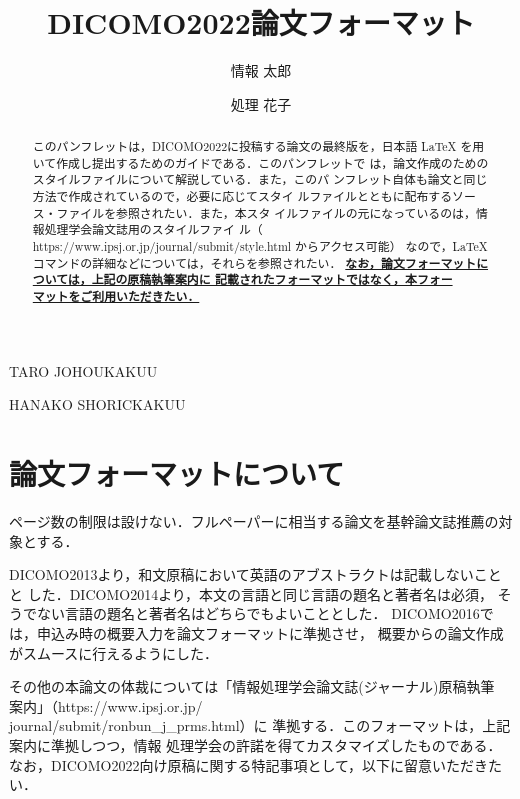 \documentclass[Japanese]{dicomopapers}
\begin{document}
\title{DICOMO2022論文フォーマット}


\author{情報 太郎}{TARO JOHO}{UKAKUU}
\author{処理 花子}{HANAKO SHORI}{CKAKUU}

\begin{abstract}
このパンフレットは，DICOMO2022に投稿する論文の最終版を，日本語
{\LaTeX} を用いて作成し提出するためのガイドである．このパンフレットで
は，論文作成のためのスタイルファイルについて解説している．また，このパ
ンフレット自体も論文と同じ方法で作成されているので，必要に応じてスタイ
ルファイルとともに配布するソース・ファイルを参照されたい．また，本スタ
イルファイルの元になっているのは，情報処理学会論文誌用のスタイルファイ
ル（ https://www.ipsj.or.jp/journal/submit/style.html からアクセス可能）
なので，{\LaTeX}コマンドの詳細などについては，それらを参照されたい．
\underline{\bf なお，論文フォーマットについては，上記の原稿執筆案内に
  記載されたフォーマットではなく，本フォー}\\
\underline{\bf マットをご利用いただきたい．}

\end{abstract}

\maketitle

\section{論文フォーマットについて}
ページ数の制限は設けない．フルペーパーに相当する論文を基幹論文誌推薦の対象とする．

DICOMO2013より，和文原稿において英語のアブストラクトは記載しないことと
した．DICOMO2014より，本文の言語と同じ言語の題名と著者名は必須，
そうでない言語の題名と著者名はどちらでもよいこととした．
DICOMO2016では，申込み時の概要入力を論文フォーマットに準拠させ，
概要からの論文作成がスムースに行えるようにした．

その他の本論文の体裁については「情報処理学会論文誌(ジャーナル)原稿執筆
  案内」（https://www.ipsj.or.jp/\\journal/submit/ronbun\_j\_prms.html）に
準拠する\cite{webpage}．このフォーマットは，上記案内に準拠しつつ，情報
処理学会の許諾を得てカスタマイズしたものである．
なお，DICOMO2022向け原稿に関する特記事項として，以下に留意いただきたい．
\end{document}

